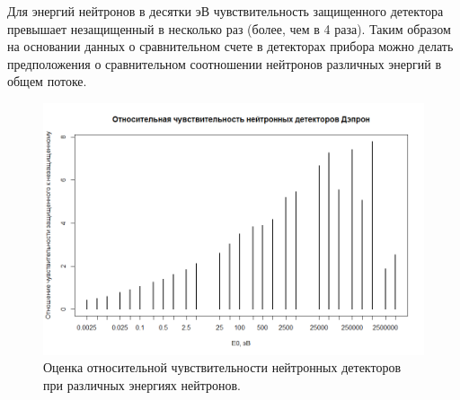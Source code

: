 Для энергий нейтронов в десятки эВ чувствительность защищенного детектора превышает незащищенный в несколько раз (более, чем в 4 раза). Таким образом на основании данных о сравнительном счете в детекторах прибора можно делать предположения о сравнительном соотношении нейтронов различных энергий в общем потоке.
\begin{figure}
	\centering
	\includegraphics[width=0.6\linewidth]{images/neutrons/otnsensetiv}
	\caption{Оценка относительной чувствительности нейтронных детекторов при различных энергиях нейтронов.}
	\label{fig:otnsensetiv}
\end{figure}



